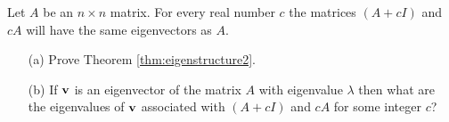 \begin{thm}\label{thm:eigenstructure2}
    Let $A$ be an $n\times n$ matrix.  For every real number $c$ the matrices $(A + cI)$ and
    $cA$ will have the same eigenvectors as $A$.
\end{thm}
\begin{problem}
    \begin{enumerate}
        \item[(a)] Prove Theorem \ref{thm:eigenstructure2}.
        \item[(b)] If ${\bf v}$ is an eigenvector of the matrix $A$ with eigenvalue $\lambda$
            then what are the eigenvalues of ${\bf v}$ associated with $(A+cI)$ and $cA$ for some
            integer $c$?
    \end{enumerate}
\end{problem}




